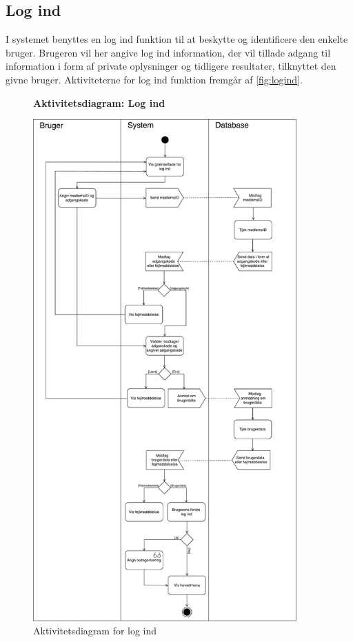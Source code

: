 \subsection*{Log ind}
I systemet benyttes en log ind funktion til at beskytte og identificere den enkelte bruger. Brugeren vil her angive log ind information, der vil tillade adgang til information i form af private oplysninger og tidligere resultater, tilknyttet den givne bruger. Aktiviteterne for log ind funktion fremgår af \autoref{fig:logind}.    


\begin{figure} [H]
\centering
\textbf{Aktivitetsdiagram: Log ind}\par\medskip
\includegraphics[width=0.9\textwidth]{figures/aktivitetsdiagram/Logind}
\caption{Aktivitetsdiagram for log ind}
\label{fig:logind}
\end{figure}


